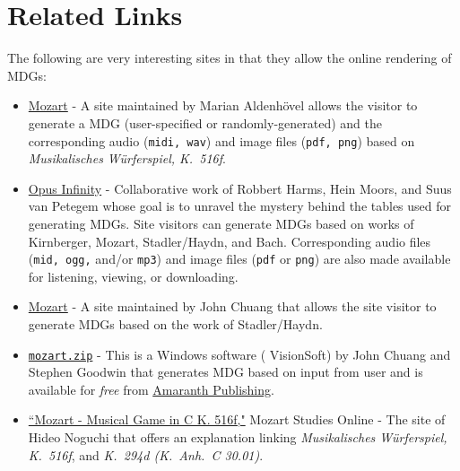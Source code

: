 \documentclass[a4paper,x11names,svgnames,10pt]{article}
\begin{document}
\section{Related Links}
The following are very interesting sites in that they allow the online rendering of MDGs:
\begin{itemize}
	\item  \href{https://marian-aldenhoevel.de/mozart/}{Mozart} - A site maintained by Marian Aldenh\"{o}vel allows the visitor to generate a MDG (user-specified or randomly-generated) and the corresponding audio ({\tt midi, wav}) and image files ({\tt pdf, png}) based on {\em Musikalisches W\"{u}rferspiel, K.\ 516f}.
	
	\item \href{https://opus-infinity.org}{Opus Infinity} - Collaborative work of Robbert Harms, Hein Moors, and Suus van Petegem whose goal is to unravel the mystery behind the tables used for generating MDGs.  Site visitors can generate MDGs based on works of Kirnberger, Mozart, Stadler/Haydn, and Bach.  Corresponding audio files ({\tt mid, ogg,} and/or {\tt mp3}) and image files ({\tt pdf} or {\tt png}) are also made available for listening, viewing, or downloading.
	
	\item  \href{http://sunsite.univie.ac.at/Mozart/dice/}{Mozart} - A site maintained by John Chuang that allows the site visitor to generate MDGs based on the work of Stadler/Haydn.
 	
 	\item \href{https://www.amaranthpublishing.com/mozart.zip}{\tt mozart.zip} -  This is a Windows software ( VisionSoft) by John Chuang and Stephen Goodwin that generates MDG based on input from user and is available for {\it free} from  \href{http://www.amaranthpublishing.com/MozartDiceGame.htm}{Amaranth Publishing}.  
 	
 	\item \href{(http://www.asahi-net.or.jp/\~rb5h-ngc/e/k516f.htm}{``Mozart - Musical Game in C K. 516f,"}	Mozart Studies Online - The site of Hideo Noguchi that offers an explanation linking {\em Musikalisches W\"{u}rferspiel, K.\ 516f}, and  {\em K.\ 294d (K.\ Anh.\ C 30.01)}. 
\end{itemize}
\end{document}
